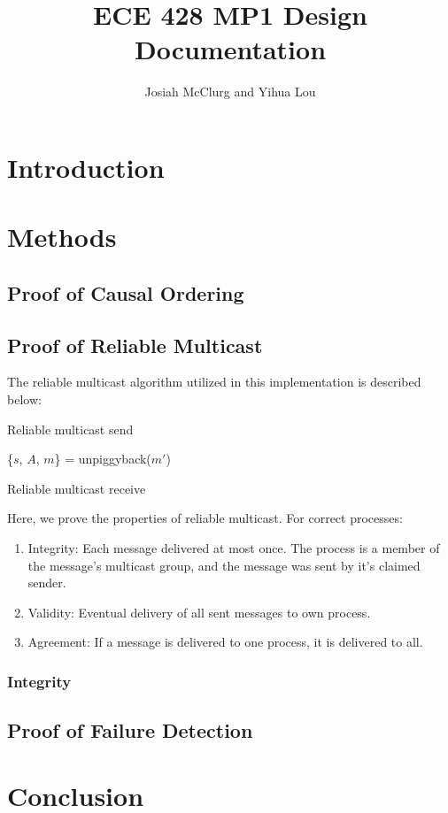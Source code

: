 \documentclass[]{article}
\title{ECE 428 MP1 Design Documentation}
\author{Josiah McClurg and Yihua Lou}
\begin{document}
\maketitle

\begin{abstract}

\end{abstract}

\section{Introduction}
\section{Methods}
\subsection{Proof of Causal Ordering}

\subsection{Proof of Reliable Multicast}
The reliable multicast algorithm utilized in this implementation is described below:

\begin{algorithm}[t]
\SetAlgoNoLine
{}
\caption{Reliable multicast send}
\label{alg:one}
\end{algorithm}

\begin{algorithm}[t]
\SetAlgoNoLine
{}
\{$s$, $A$, $m$\} = unpiggyback($m'$)\;
\Else{
}
\caption{Reliable multicast receive}
\label{alg:two}
\end{algorithm}

Here, we prove the properties of reliable multicast. For correct processes:
\begin{enumerate}
\item Integrity: Each message delivered at most once. The process is a member of the message's multicast group, and the message was sent by it's claimed sender. 
\item Validity: Eventual delivery of all sent messages to own process.
\item Agreement: If a message is delivered to one process, it is delivered to all.
\end{enumerate}


\subsubsection{Integrity}

\subsection{Proof of Failure Detection}
\section{Conclusion}
\end{document}
